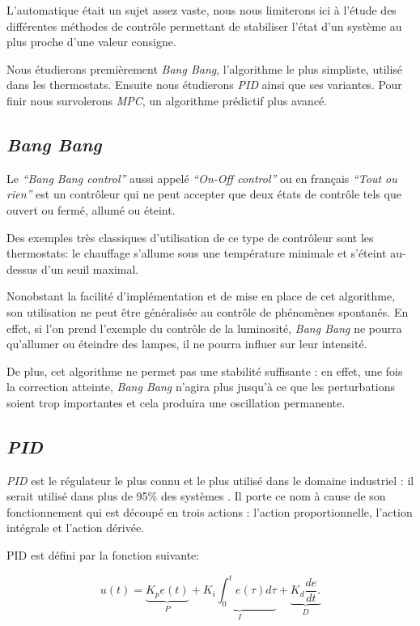 \documentclass[a4paper,10pt]{report}
\begin{document}
L'automatique était un sujet assez vaste, nous nous limiterons ici à l'étude des différentes méthodes de contrôle permettant de stabiliser l'état d'un système au plus proche d'une valeur consigne.

Nous étudierons premièrement \emph{Bang Bang}, l'algorithme le plus simpliste, utilisé dans les thermostats.
Ensuite nous étudierons \emph{PID} ainsi que ses variantes.
Pour finir nous survolerons \emph{MPC}, un algorithme prédictif plus avancé.

\subsection{\emph{Bang Bang}}
Le \emph{``Bang Bang control''} aussi appelé \emph{``On-Off control''} ou en français \emph{``Tout ou rien''} est un contrôleur qui ne peut accepter que deux états de contrôle tels que ouvert ou fermé, allumé ou éteint.

Des exemples très classiques d'utilisation de ce type de contrôleur sont les thermostats: le chauffage s'allume sous une température minimale et s'éteint au-dessus d'un seuil maximal.

Nonobstant la facilité d'implémentation et de mise en place de cet algorithme, son utilisation ne peut être généralisée au contrôle de phénomènes spontanés. En effet, si l'on prend l'exemple du contrôle de la luminosité, \emph{Bang Bang} ne pourra qu'allumer ou éteindre des lampes, il ne pourra influer sur leur intensité. \cite{Burghes2004}

De plus, cet algorithme ne permet pas une stabilité suffisante : en effet, une fois la correction atteinte, \emph{Bang Bang} n'agira plus jusqu'à ce que les perturbations soient trop importantes et cela produira une oscillation permanente. \cite{ballard1993pid}


\subsection{\emph{PID}}
\label{PID}

\emph{PID} est le régulateur le plus connu et le plus utilisé dans le domaine industriel : il serait utilisé dans plus de 95\% des systèmes \cite{Kinnaert2013, aastrom2002control}.
Il porte ce nom à cause de son fonctionnement qui est découpé en trois actions : l'action proportionnelle, l'action intégrale et l'action dérivée.

PID est défini par la fonction suivante:

\begin{equation}
  u(t) =
    \underbrace{K_p e(t)}_{P} +
    \underbrace{K_i \int_{0}^{t} e(\tau) d\tau}_{I} +
    \underbrace{K_d \frac{de}{dt}.}_{D}
\end{equation}
\end{document}
